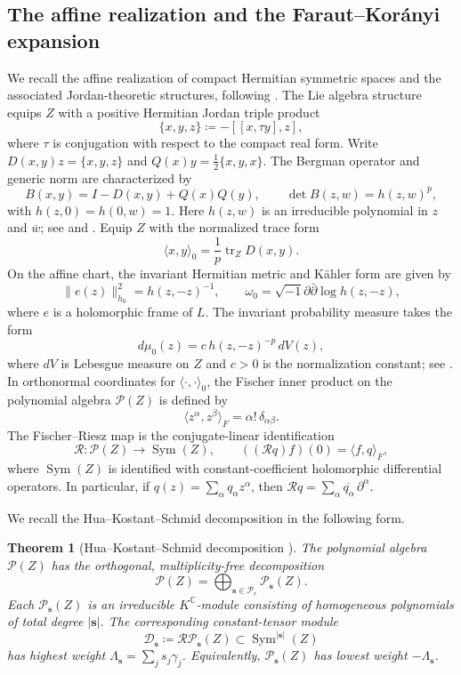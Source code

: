 \documentclass[11pt,reqno]{amsart}
\newtheorem{theorem}{Theorem}[section]
\theoremstyle{corollary}
\theoremstyle{conjecture}
\theoremstyle{assumption}
\theoremstyle{proposition}
\theoremstyle{remark}
\numberwithin{equation}{section}
\newcommand{\ii}{\ensuremath{\sqrt{-1}}}
\newcommand{\pa}{\partial}
\newcommand{\pp}{\bar\partial}
\begin{document}
\subsection{The affine realization and the Faraut--Kor\'anyi expansion}
\label{subsec:affine-realization}
We recall the affine realization of compact Hermitian symmetric spaces and the associated Jordan-theoretic structures, following \cite{Knapp2002,Loos1977,Schwarz2013}.
The Lie algebra structure equips $Z$ with a positive Hermitian Jordan triple product
\[
\{x,y,z\}\coloneq-[[x,\tau y],z],
\]
where $\tau$ is conjugation with respect to the compact real form. Write $D(x,y)z=\{x,y,z\}$ and $Q(x)y=\frac12\{x,y,x\}$. The Bergman operator and generic norm are characterized by
\[
B(x,y)=I-D(x,y)+Q(x)Q(y),\qquad \det B(z,w)=h(z,w)^p,
\]
with $h(z,0)=h(0,w)=1$. Here $h(z,w)$ is an irreducible polynomial in $z$ and $\overline w$; see \cite[\S4.15]{Loos1977} and \cite[(2.5)--(2.6)]{Schwarz2013}. Equip $Z$ with the normalized trace form
\[
\langle x,y\rangle_0=\frac1p\operatorname{tr}_Z D(x,y).
\]
On the affine chart, the invariant Hermitian metric and K\"ahler form are given by
\[
\|e(z)\|_{h_0}^2=h(z,-z)^{-1},\qquad \omega_0=\ii\pa\pp\log h(z,-z),
\]
where $e$ is a holomorphic frame of $L$. The invariant probability measure takes the form
\[
d\mu_0(z)=c\,h(z,-z)^{-p}\,dV(z),
\]
where $dV$ is Lebesgue measure on $Z$ and $c>0$ is the normalization constant; see \cite{EnglisZhang2010}.
In orthonormal coordinates for $\langle\cdot,\cdot\rangle_0$, the Fischer inner product on the polynomial algebra $\mathcal P(Z)$ is defined by
\[
\langle z^\alpha,z^\beta\rangle_F=\alpha!\,\delta_{\alpha\beta}.
\]
The Fischer--Riesz map is the conjugate-linear identification
\[
\mathcal R\colon\mathcal P(Z)\longrightarrow\operatorname{Sym}(Z),\qquad ((\mathcal Rq)f)(0)=\langle f,q\rangle_F,
\]
where $\operatorname{Sym}(Z)$ is identified with constant-coefficient holomorphic differential operators. In particular, if $q(z)=\sum_\alpha q_\alpha z^\alpha$, then $\mathcal Rq=\sum_\alpha\overline{q_\alpha}\,\pa^\alpha$.

We recall the Hua--Kostant--Schmid decomposition in the following form.
\begin{theorem}[Hua--Kostant--Schmid decomposition {\cite{Hua1963,Schmid1969,FarautKoranyi1990}}]
\label{thm:pre-hks}
The polynomial algebra $\mathcal P(Z)$ has the orthogonal, multiplicity-free decomposition
\[
\mathcal P(Z)=\bigoplus_{\mathbf s\in\mathcal P_r}\mathcal P_{\mathbf s}(Z).
\]
Each $\mathcal P_{\mathbf s}(Z)$ is an irreducible $K^{\mathbb C}$-module consisting of homogeneous polynomials of total degree $|\mathbf s|$. The corresponding constant-tensor module
\[
\mathcal D_{\mathbf s}\coloneq\mathcal R\mathcal P_{\mathbf s}(Z)\subset\operatorname{Sym}^{|\mathbf s|}(Z)
\]
has highest weight $\Lambda_{\mathbf s}=\sum_j s_j\gamma_j$. Equivalently, $\mathcal P_{\mathbf s}(Z)$ has lowest weight $-\Lambda_{\mathbf s}$.
\end{theorem}
\end{document}
